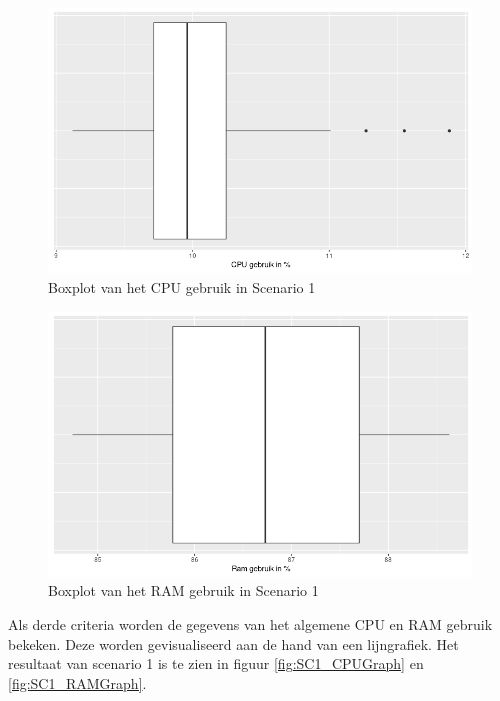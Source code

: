 %
\begin{figure}[h]
	\centering
	\includegraphics[width=0.75\linewidth]{img/SC1_CPUBox.png}
	\caption{Boxplot van het CPU gebruik in Scenario 1}
	\label{fig:SC1_CPUBox}
\end{figure}

\begin{figure}[h]
	\centering
	\includegraphics[width=0.75\linewidth]{img/SC1_RAMBox.png}
	\caption{Boxplot van het RAM gebruik in Scenario 1}
	\label{fig:SC1_RAMBox}
\end{figure}

Als derde criteria worden de gegevens van het algemene CPU en RAM gebruik bekeken. Deze worden gevisualiseerd aan de hand van een lijngrafiek. Het resultaat van scenario 1 is te zien in figuur \ref{fig:SC1_CPUGraph} en \ref{fig:SC1_RAMGraph}.

